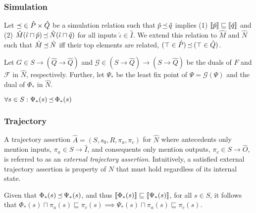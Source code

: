 \subsubsection{Simulation} Let $\operatorname{\mathrel{\preceq}} \in \hat P \times \hat Q$ be a simulation relation such that $\hat p \operatorname{\mathrel{\preceq}} \hat q$ implies (1) $\llbracket\hat p\rrbracket \sqsubseteq \llbracket\hat q\rrbracket$ and (2) $\hat M(\hat \iota \sqcap \hat p) \operatorname{\mathrel{\preceq}} \hat N(\hat \iota \sqcap \hat q)$ for all inputs $\hat \iota \in \hat I$. We extend this relation to $\hat M$ and $\hat N$ such that $\hat M \operatorname{\mathrel{\preceq}} \hat N$ iff their top elements are related, $(\top \in \hat P) \operatorname{\mathrel{\preceq}} \, (\top \in \hat Q)$.






Let $G \in S \rightarrow (\hat Q \rightarrow \hat Q)$ and $\mathcal{G} \in (S \rightarrow \hat Q) \rightarrow (S \rightarrow \hat Q)$ be the duals of $F$ and $\mathcal{F}$ in $\hat N$, respectively. Further, let $\Psi_{*}$ be the least fix point of $\Psi = \mathcal{G}(\Psi)$ and the dual of $\Phi_{*}$ in $\hat N$.

\begin{lemma}
$\forall s \in S : \Psi_{*}(s) \operatorname{\mathrel{\preceq}} \Phi_{*}(s)$
\end{lemma}

\subsubsection{Trajectory} A trajectory assertion $\hat A = (S,s_{0},R,\pi_{a},\pi_{c})$ for $\hat N$ where antecedents only mention inputs, $\pi_{a} \in S \rightarrow \hat I$, and consequents only mention outputs, $\pi_{c} \in S \rightarrow \hat O$, is referred to as an \textit{external trajectory assertion}. Intuitively, a satisfied external trajectory assertion is property of $N$ that must hold regardless of its internal state.

Given that $\Phi_{*}(s) \operatorname{\mathrel{\preceq}} \Psi_{*}(s)$, and thus $\llbracket\Phi_{*}(s)\rrbracket \sqsubseteq \llbracket\Psi_{*}(s)\rrbracket$, for all $s \in S$, it follows that $\Phi_{*}(s) \sqcap \pi_{a}(s) \sqsubseteq \pi_{c}(s) \implies \Psi_{*}(s) \sqcap \pi_{a}(s) \sqsubseteq \pi_{c}(s)$.

